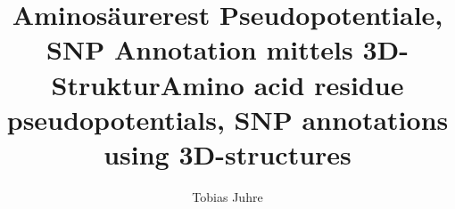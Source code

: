\documentclass[master,german]{hgbthesis}
\begin{document}

\title{Aminosäurerest Pseudopotentiale, SNP Annotation mittels 3D-Struktur\texorpdfstring{\newline \newline }{}Amino acid residue pseudopotentials, SNP annotations using 3D-structures}
\author{Tobias Juhre}




\frontmatter
\maketitle
\tableofcontents






\mainmatter         %



%





%

\appendix

\printbibliography  %


\end{document}
